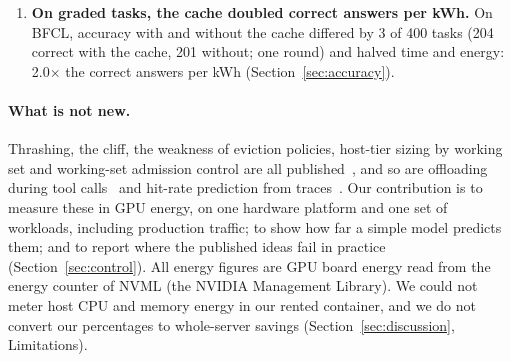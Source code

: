 \begin{enumerate}
$K$ agents from Eq.~\eqref{eq:gate} above that, cost no energy below the cliff, with 90th-percentile resume latency no worse. Above it, in 150\,s
steps, it cut energy per turn by 41--45\% but left a third to a half of the sessions unserved at the highest loads; in
600\,s steps it served every session, completed 48--62\% more turns and cut energy per turn by 42--50\%, at the price of
queueing: the 90th percentile of first-turn latency was 1.9--2.7 times the GPU cache's (Section~\ref{sec:control}).
\item \textbf{On graded tasks, the cache doubled correct answers per kWh.} On BFCL, accuracy with and without the cache differed by 3 of 400 tasks (204 correct with the cache,
201 without; one round) and halved time and energy: 2.0$\times$ the correct answers per kWh (Section~\ref{sec:accuracy}).
\end{enumerate}

\paragraph{What is not new.} Thrashing, the cliff, the weakness of eviction policies, host-tier sizing by working set
and working-set admission control are all published~\cite{chen2026concur,he2026robot,lu2026metastability,
shao2026efficientagent,denning1968working}, and so are offloading during tool calls~\cite{xia2026mori,tokencake2025}
and hit-rate prediction from traces~\cite{kvset2026}. Our contribution is to measure these in GPU energy, on one
hardware platform and one set of workloads, including production traffic; to show how far a simple model predicts them; and to report where
the published ideas fail in practice (Section~\ref{sec:control}). All energy figures are GPU board energy read from
the energy counter of NVML (the NVIDIA Management Library). We could not meter host CPU and memory energy in our rented container, and we do not convert
our percentages to whole-server savings (Section~\ref{sec:discussion}, Limitations).


